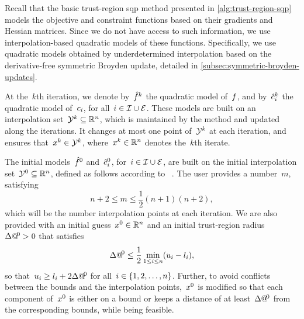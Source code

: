 Recall that the basic trust-region \gls{sqp} method presented in \cref{alg:trust-region-sqp} models the objective and constraint functions based on their gradients and Hessian matrices.
Since we do not have access to such information, we use interpolation-based quadratic models of these functions.
Specifically, we use quadratic models obtained by underdetermined interpolation based on the derivative-free symmetric Broyden update, detailed in \cref{subsec:symmetric-broyden-updates}.

At the~$k$th iteration, we denote by~$\objm[k]$ the quadratic model of~$f$, and by~$\conm[k]{i}$ the quadratic model of~$c_{i}$, for all~$i \in \mathcal{I} \cup \mathcal{E}$.
These models are built on an interpolation set~$\xpt[k] \subseteq \R^n$, which is maintained by the method and updated along the iterations.
It changes at most one point of~$\xpt[k]$ at each iteration, and ensures that~$\iter[k] \in \xpt[k]$, where~$\iter[k] \in \R^n$ denotes the~$k$th iterate.

The initial models~$\objm[0]$ and~$\conm[0]{i}$, for~$i \in \mathcal{I} \cup \mathcal{E}$, are built on the initial interpolation set~$\xpt[0] \subseteq \R^n$, defined as follows according to \citeauthor{Powell_2009}~\cite{Powell_2009}.
The user provides a number~$m$, satisfying
\begin{equation*}
    n + 2 \le m \le \frac{1}{2} (n + 1) (n + 2),
\end{equation*}
which will be the number interpolation points at each iteration.
We are also provided with an initial guess~$\iter[0] \in \R^n$ and an initial trust-region radius~$\rad[0] > 0$ that satisfies
\begin{equation*}
    \rad[0] \le \frac{1}{2} \min_{1 \le i \le n} (\xu_i - \xl_i),
\end{equation*}
so that~$\xu_i \ge \xl_i + 2 \rad[0]$ for all~$i \in \{1, 2, \dots, n\}$.
Further, to avoid conflicts between the bounds and the interpolation points,~$\iter[0]$ is modified so that each component of~$\iter[0]$ is either on a bound or keeps a distance of at least~$\rad[0]$ from the corresponding bounds, while being feasible.

